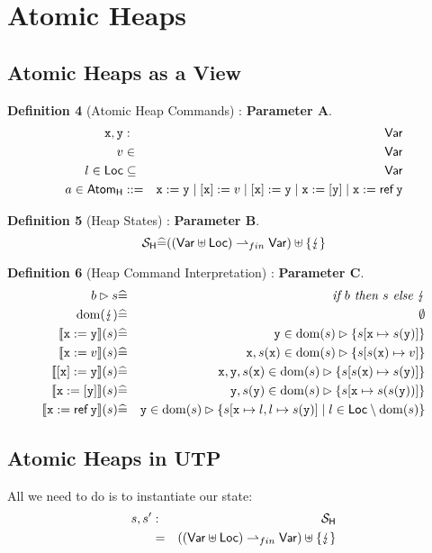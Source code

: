 \section{Atomic Heaps}

\subsection{Atomic Heaps as a View}

\textbf{Definition 4 }(Atomic Heap Commands) : \textbf{Parameter A}.
\begin{eqnarray*}
   \mathtt{x},\mathtt{y} &:& \mathsf{Var}
\\ v &\in& \mathsf{Var}
\\ l \in \mathsf{Loc} &\subseteq& \mathsf{Var}
\\ a \in \mathsf{Atom_{H}}
   &::=&
   \mathtt{x} := \mathtt{y}
   \mid
   [\mathtt{x}] := v
   \mid
   [\mathtt{x}] := \mathtt{y}
   \mid
   \mathtt{x} := [\mathtt{y}]
   \mid
   \mathtt{x} := \mathop{\mathsf{ref}}\mathtt{y}
\end{eqnarray*}

\textbf{Definition 5} (Heap States) : \textbf{Parameter B}.
\[
 \mathcal{S}_{\mathsf{H}} \widehat= ((\mathsf{Var} \uplus \mathsf{Loc}) \rightharpoonup_{fin} \mathsf{Var}) \uplus \{\lightning\}
\]

\textbf{Definition 6} (Heap Command Interpretation) : \textbf{Parameter C}.
\begin{eqnarray*}
   b \rhd s &\defs& \textit{if }b\textit{ then }s\textit{ else }\bang
\\ \dom(\bang) &\defs& \emptyset
\\ \sem{\vx:=\vy}(s)
              &\defs& \vy \in \dom(s)\rhd \setof{s[\vx \mapsto s(\vy)]}
\\ \sem{\vx:=v}(s)
              &\defs& \vx,s(\vx) \in \dom(s)\rhd \setof{s[s(\vx) \mapsto v]}
\\ \sem{[\vx]:=\vy}(s)
              &\defs& \vx,\vy,s(\vx) \in \dom(s)\rhd \setof{s[s(\vx) \mapsto s(\vy)]}
\\ \sem{\vx:=[\vy]}(s)
              &\defs& \vy,s(\vy) \in \dom(s)\rhd \setof{s[\vx \mapsto s(s(\vy))]}
\\ \sem{\vx:=\reft\vy}(s)
              &\defs& \vy \in \dom(s)\rhd
              \setof{s[\vx \mapsto l,l \mapsto s(\vy)] \mid l \in \Loc \setminus \dom(s) }
\end{eqnarray*}


\subsection{Atomic Heaps in UTP}

All we need to do is to instantiate our state:
\begin{eqnarray*}
  s,s' &:& \mathcal{S}_{\mathsf{H}}
\\ &=& ((\mathsf{Var} \uplus \mathsf{Loc}) \rightharpoonup_{fin} \mathsf{Var}) \uplus \{\lightning\}
\end{eqnarray*}


